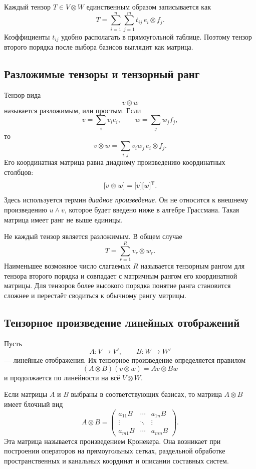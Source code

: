 Каждый тензор \(T\in V\otimes W\) единственным образом записывается как
\[
T=\sum_{i=1}^{n}\sum_{j=1}^{m}t_{ij}\,e_i\otimes f_j.
\]
Коэффициенты \(t_{ij}\) удобно располагать в прямоугольной таблице. Поэтому тензор второго порядка после выбора базисов выглядит как матрица.

\subsection{Разложимые тензоры и тензорный ранг}

Тензор вида
\[
v\otimes w
\]
называется разложимым, или простым. Если
\[
v=\sum_i v_i e_i,
\qquad
w=\sum_j w_j f_j,
\]
то
\[
v\otimes w
=
\sum_{i,j}v_iw_j\,e_i\otimes f_j.
\]
Его координатная матрица равна диадному произведению координатных столбцов:
\[
[v\otimes w]=[v][w]^{\mathsf{T}}.
\]
Здесь используется термин \emph{диадное произведение}. Он не относится к внешнему произведению \(u\wedge v\), которое будет введено ниже в алгебре Грассмана. Такая матрица имеет ранг не выше единицы.

Не каждый тензор является разложимым. В общем случае
\[
T=\sum_{r=1}^{R}v_r\otimes w_r.
\]
Наименьшее возможное число слагаемых \(R\) называется тензорным рангом для тензора второго порядка и совпадает с матричным рангом его координатной матрицы. Для тензоров более высокого порядка понятие ранга становится сложнее и перестаёт сводиться к обычному рангу матрицы.

\subsection{Тензорное произведение линейных отображений}

Пусть
\[
A:V\to V',
\qquad
B:W\to W'
\]
--- линейные отображения. Их тензорное произведение определяется правилом
\[
(A\otimes B)(v\otimes w)
=
Av\otimes Bw
\]
и продолжается по линейности на всё \(V\otimes W\).

Если матрицы \(A\) и \(B\) выбраны в соответствующих базисах, то матрица \(A\otimes B\) имеет блочный вид
\[
A\otimes B
=
\begin{pmatrix}
a_{11}B&\cdots&a_{1n}B\\
\vdots&\ddots&\vdots\\
a_{m1}B&\cdots&a_{mn}B
\end{pmatrix}.
\]
Эта матрица называется произведением Кронекера. Она возникает при построении операторов на прямоугольных сетках, раздельной обработке пространственных и канальных координат и описании составных систем.

